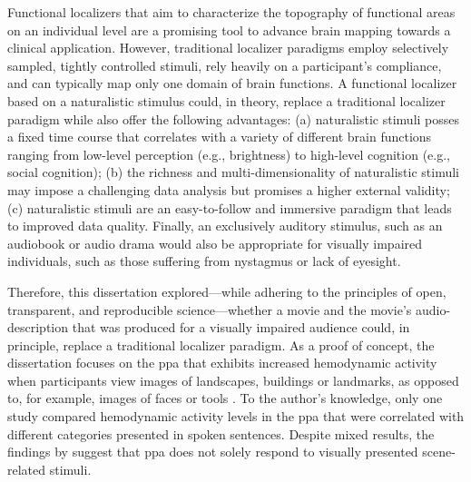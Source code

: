Functional localizers that aim to characterize the topography of functional areas
on an individual level are a promising tool to advance brain mapping towards a
clinical application.
However, traditional localizer paradigms employ selectively sampled, tightly
controlled stimuli, rely heavily on a participant's compliance, and can
typically map only one domain of brain functions.
A functional localizer based on a naturalistic stimulus could, in theory,
replace a traditional localizer paradigm while also offer the following
advantages:
(a) naturalistic stimuli posses a fixed time course that correlates with a
variety of different brain functions ranging from low-level perception (e.g.,
brightness) to high-level cognition (e.g., social cognition);
(b) the richness and multi-dimensionality of naturalistic stimuli may impose a
challenging data analysis but promises a higher external validity;
(c) naturalistic stimuli are an easy-to-follow and immersive paradigm that leads
to improved data quality.
Finally, an exclusively auditory stimulus, such as an audiobook or audio drama
would also be appropriate for visually impaired individuals, such as those
suffering from nystagmus or lack of eyesight.

Therefore, this dissertation explored---while adhering to the principles of
open, transparent, and reproducible science---whether a movie and the movie's
audio-description that was produced for a visually impaired audience could, in
principle, replace a traditional localizer paradigm.
As a proof of concept, the dissertation focuses on the \ac{ppa} that exhibits
increased hemodynamic activity when participants view images of landscapes,
buildings or landmarks, as opposed to, for example, images of faces or tools
\citep[s.][for reviews]{epstein2014neural, aminoff2013role}.
To the author's knowledge, only one study \citep{aziz2008modulation}
compared hemodynamic activity levels in the \ac{ppa} that were correlated with
different categories presented in spoken sentences.
%
Despite mixed results, the findings by \citet{aziz2008modulation} suggest that
\ac{ppa} does not solely respond to visually presented scene-related stimuli.

